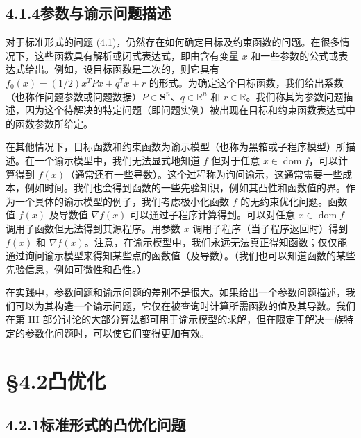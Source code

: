 \documentclass[UTF8,12pt,a4paper,fontset=fandol]{ctexart}
\begin{document}
\subsection*{4.1.4\quad 参数与谕示问题描述}

对于标准形式的问题 (4.1)，仍然存在如何确定目标及约束函数的问题。在很多情况下，这些函数具有解析或闭式表达式，即由含有变量 $x$ 和一些参数的公式或表达式给出。例如，设目标函数是二次的，则它具有 $f_0(x)=(1/2)x^TPx+q^Tx+r$ 的形式。为确定这个目标函数，我们给出系数（也称作问题参数或问题数据）$P\in\mathbf{S}^n$、$q\in\mathbb{R}^n$ 和 $r\in\mathbb{R}$。我们称其为参数问题描述，因为这个待解决的特定问题（即问题实例）被出现在目标和约束函数表达式中的函数参数所给定。

在其他情况下，目标函数和约束函数为谕示模型（也称为黑箱或子程序模型）所描述。在一个谕示模型中，我们无法显式地知道 $f$ 但对于任意 $x\in\operatorname{dom} f$，可以计算得到 $f(x)$（通常还有一些导数）。这个过程称为询问谕示，这通常需要一些成本，例如时间。我们也会得到函数的一些先验知识，例如其凸性和函数值的界。作为一个具体的谕示模型的例子，我们考虑极小化函数 $f$ 的无约束优化问题。函数值 $f(x)$ 及导数值 $\nabla f(x)$ 可以通过子程序计算得到。可以对任意 $x\in\operatorname{dom} f$ 调用子函数但无法得到其源程序。用参数 $x$ 调用子程序（当子程序返回时）得到 $f(x)$ 和 $\nabla f(x)$。注意，在谕示模型中，我们永远无法真正得知函数；仅仅能通过询问谕示模型来得知某些点的函数值（及导数）。（我们也可以知道函数的某些先验信息，例如可微性和凸性。）

在实践中，参数问题和谕示问题的差别不是很大。如果给出一个参数问题描述，我们可以为其构造一个谕示问题，它仅在被查询时计算所需函数的值及其导数。我们在第 III 部分讨论的大部分算法都可用于谕示模型的求解，但在限定于解决一族特定的参数化问题时，可以使它们变得更加有效。

\section*{§4.2\quad 凸优化}

\subsection*{4.2.1\quad 标准形式的凸优化问题}
\end{document}
